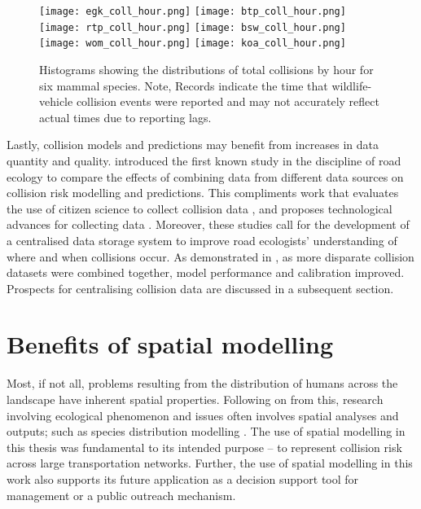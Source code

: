 \begin{figure*}[!t]
  \centering
	\begin{minipage}[t]{.9\textwidth}
    	\centering
    	\texttt{[image: egk\_coll\_hour.png]}\hspace{.05\textwidth}
    	\texttt{[image: btp\_coll\_hour.png]}\\ 
    	\texttt{[image: rtp\_coll\_hour.png]}\hspace{.05\textwidth}
    	\texttt{[image: bsw\_coll\_hour.png]}\\
    	\texttt{[image: wom\_coll\_hour.png]}\hspace{.05\textwidth}
    	\texttt{[image: koa\_coll\_hour.png]}
    \end{minipage}
  \caption[Total collisions by hour for six mammal species]{Histograms showing the distributions of total collisions by hour for six mammal species. Note, Records indicate the time that wildlife-vehicle collision events were reported and may not accurately reflect actual times due to reporting lags.}
  \label{temporal_all}
\end{figure*}

Lastly, collision models and predictions may benefit from increases in data quantity and quality.  introduced the first known study in the discipline of road ecology to compare the effects of combining data from different data sources on collision risk modelling and predictions. This compliments work that evaluates the use of citizen science to collect collision data \citep{paul14, dwye16}, and proposes technological advances for collecting data \citep{olso14}. Moreover, these studies call for the development of a centralised data storage system to improve road ecologists' understanding of where and when collisions occur. As demonstrated in , as more disparate collision datasets were combined together, model performance and calibration improved. Prospects for centralising collision data are discussed in a subsequent section. 

\section{Benefits of spatial modelling}

Most, if not all, problems resulting from the distribution of humans across the landscape have inherent spatial properties. Following on from this, research involving ecological phenomenon and issues often involves spatial analyses and outputs; such as species distribution modelling \citep[e.g.][]{elit09}. The use of spatial modelling in this thesis was fundamental to its intended purpose -- to represent collision risk across large transportation networks. Further, the use of spatial modelling in this work also supports its future application as a decision support tool for management or a public outreach mechanism.

